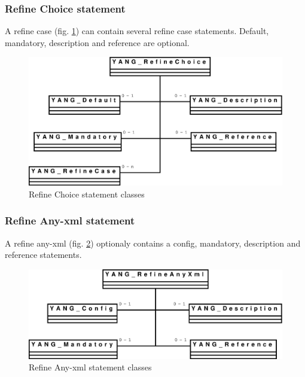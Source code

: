 \documentclass[a4paper]{article}
\begin{document}
\subsubsection{Refine Choice statement}

A refine  case (fig.   \ref{refinechoice}) can contain  several refine
case  statements. Default,  mandatory, description  and  reference are
optional.
\begin{figure}[htbp]
\begin{center}
\includegraphics[scale = .3]{refinechoice.eps}
\end{center}
\caption{Refine Choice statement classes}
\label{refinechoice}
\end{figure}

\subsubsection{Refine Any-xml statement}

A  refine  any-xml  (fig.  \ref{refineanyxml})  optionaly  contains  a
config, mandatory, description and reference statements.
\begin{figure}[htbp]
\begin{center}
\includegraphics[scale = .3]{refineanyxml.eps}
\end{center}
\caption{Refine Any-xml statement classes}
\label{refineanyxml}
\end{figure}
\end{document}
